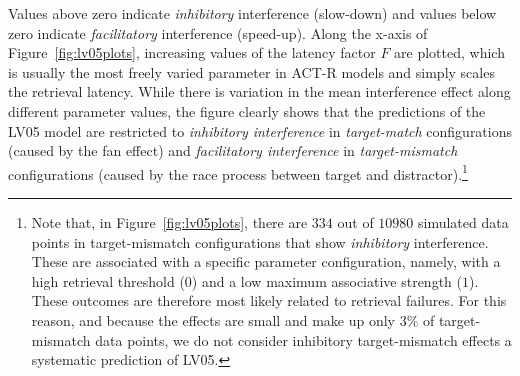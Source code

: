 \documentclass{cambridge7A}\usepackage[]{graphicx}\usepackage[]{color}
\newcommand{\revisedII}[1]{#1}
\begin{document}
Values above zero indicate  \emph{inhibitory} interference (slow-down) and values below zero indicate  \emph{facilitatory} interference (speed-up). 
Along the x-axis of Figure~\ref{fig:lv05plots}, increasing values of the latency factor $F$ are plotted, which is usually the most freely varied parameter in ACT-R models and simply scales the retrieval latency. 
While there is variation in the mean interference effect along different parameter values, the figure clearly shows that the predictions of the LV05 model are restricted to \emph{inhibitory interference} in \emph{target-match} configurations (caused by the fan effect) and \emph{facilitatory interference} in \emph{target-mismatch} configurations (caused by the race process between target and distractor).\footnote{
\revisedII{
	Note that, in Figure~\ref{fig:lv05plots}, there are $334$ out of $10980$ simulated data points in target-mismatch configurations that show \textit{inhibitory} interference. These are associated with a specific parameter configuration, namely, with a high retrieval threshold ($0$) and a low maximum associative strength ($1$). These outcomes are therefore most likely related to retrieval failures. For this reason, and because the effects are small and make up only $3\%$ of target-mismatch data points, we do not consider inhibitory target-mismatch effects a systematic prediction of LV05.
}
}


\end{document}
